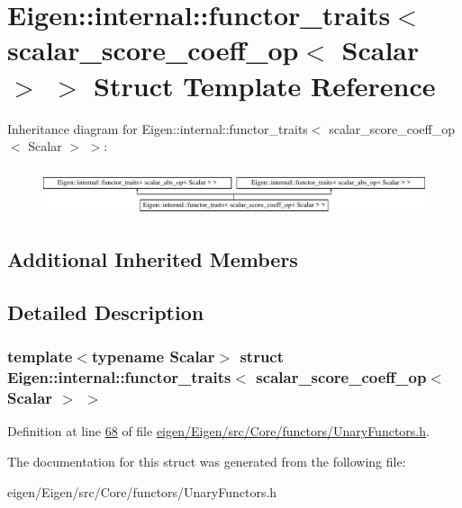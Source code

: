 \hypertarget{struct_eigen_1_1internal_1_1functor__traits_3_01scalar__score__coeff__op_3_01_scalar_01_4_01_4}{}\section{Eigen\+:\+:internal\+:\+:functor\+\_\+traits$<$ scalar\+\_\+score\+\_\+coeff\+\_\+op$<$ Scalar $>$ $>$ Struct Template Reference}
\label{struct_eigen_1_1internal_1_1functor__traits_3_01scalar__score__coeff__op_3_01_scalar_01_4_01_4}
Inheritance diagram for Eigen\+:\+:internal\+:\+:functor\+\_\+traits$<$ scalar\+\_\+score\+\_\+coeff\+\_\+op$<$ Scalar $>$ $>$\+:\begin{figure}[H]
\begin{center}
\leavevmode
\includegraphics[height=1.414141cm]{struct_eigen_1_1internal_1_1functor__traits_3_01scalar__score__coeff__op_3_01_scalar_01_4_01_4}
\end{center}
\end{figure}
\subsection*{Additional Inherited Members}


\subsection{Detailed Description}
\subsubsection*{template$<$typename Scalar$>$\newline
struct Eigen\+::internal\+::functor\+\_\+traits$<$ scalar\+\_\+score\+\_\+coeff\+\_\+op$<$ Scalar $>$ $>$}



Definition at line \hyperlink{eigen_2_eigen_2src_2_core_2functors_2_unary_functors_8h_source_l00068}{68} of file \hyperlink{eigen_2_eigen_2src_2_core_2functors_2_unary_functors_8h_source}{eigen/\+Eigen/src/\+Core/functors/\+Unary\+Functors.\+h}.



The documentation for this struct was generated from the following file\+:\begin{DoxyCompactItemize}
\item 
eigen/\+Eigen/src/\+Core/functors/\+Unary\+Functors.\+h\end{DoxyCompactItemize}
